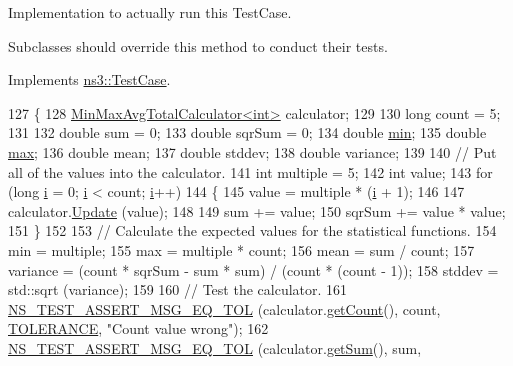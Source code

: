 Implementation to actually run this Test\+Case. 

Subclasses should override this method to conduct their tests. 

Implements \hyperlink{classns3_1_1TestCase_a8ff74680cf017ed42011e4be51917a24}{ns3\+::\+Test\+Case}.


\begin{DoxyCode}
127 \{
128   \hyperlink{classns3_1_1MinMaxAvgTotalCalculator}{MinMaxAvgTotalCalculator<int>} calculator;
129 
130   \textcolor{keywordtype}{long} count = 5;
131 
132   \textcolor{keywordtype}{double} sum = 0;
133   \textcolor{keywordtype}{double} sqrSum = 0;
134   \textcolor{keywordtype}{double} \hyperlink{80211b_8c_ac6afabdc09a49a433ee19d8a9486056d}{min};
135   \textcolor{keywordtype}{double} \hyperlink{80211b_8c_affe776513b24d84b39af8ab0930fef7f}{max};
136   \textcolor{keywordtype}{double} mean;
137   \textcolor{keywordtype}{double} stddev;
138   \textcolor{keywordtype}{double} variance;
139 
140   \textcolor{comment}{// Put all of the values into the calculator.}
141   \textcolor{keywordtype}{int} multiple = 5;
142   \textcolor{keywordtype}{int} value;
143   \textcolor{keywordflow}{for} (\textcolor{keywordtype}{long} \hyperlink{bernuolliDistribution_8m_a6f6ccfcf58b31cb6412107d9d5281426}{i} = 0; \hyperlink{bernuolliDistribution_8m_a6f6ccfcf58b31cb6412107d9d5281426}{i} < count; \hyperlink{bernuolliDistribution_8m_a6f6ccfcf58b31cb6412107d9d5281426}{i}++)
144     \{
145       value = multiple * (\hyperlink{bernuolliDistribution_8m_a6f6ccfcf58b31cb6412107d9d5281426}{i} + 1);
146 
147       calculator.\hyperlink{classns3_1_1MinMaxAvgTotalCalculator_acad1745a8441535648ae95c7037a96e1}{Update} (value);
148 
149       sum    += value;
150       sqrSum += value * value;
151     \}
152 
153   \textcolor{comment}{// Calculate the expected values for the statistical functions.}
154   min = multiple;
155   max = multiple * count;
156   mean = sum / count;
157   variance = (count * sqrSum - sum * sum) / (count * (count - 1));
158   stddev = std::sqrt (variance);
159 
160   \textcolor{comment}{// Test the calculator.}
161   \hyperlink{group__testing_ga9e7861b56b4e70db3b56044cb7a28e41}{NS\_TEST\_ASSERT\_MSG\_EQ\_TOL} (calculator.\hyperlink{classns3_1_1MinMaxAvgTotalCalculator_a8f614c4a6a090665a75cea91a68d4486}{getCount}(),    count,    
      \hyperlink{basic-data-calculators-test-suite_8cc_a89311a98397f9d6967d2cb10d5152d77}{TOLERANCE}, \textcolor{stringliteral}{"Count value wrong"});
162   \hyperlink{group__testing_ga9e7861b56b4e70db3b56044cb7a28e41}{NS\_TEST\_ASSERT\_MSG\_EQ\_TOL} (calculator.\hyperlink{classns3_1_1MinMaxAvgTotalCalculator_ae18def40cc95735a4059b8aefb7ba827}{getSum}(),      sum,      

\end{DoxyCode}
